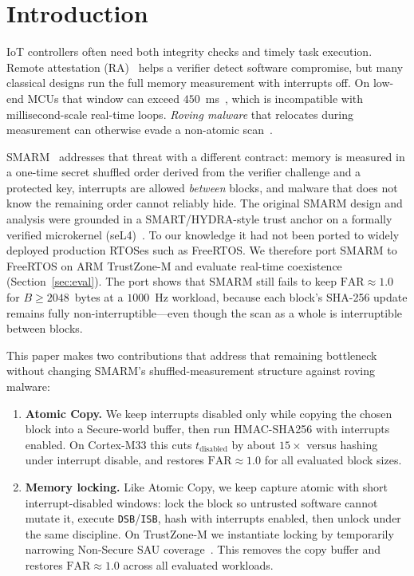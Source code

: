 \documentclass[conference]{IEEEtran}
\newcommand{\tdis}{$t_{\mathrm{disabled}}$\xspace}
\begin{document}
\section{Introduction}
\label{sec:intro}

IoT controllers often need both integrity checks and timely task
execution. Remote attestation
(RA)~\cite{eldefrawy2012smart,nunes2019vrased,eldefrawy2017hydra}
helps a verifier detect software compromise, but many classical designs
run the full memory measurement with interrupts off. On low-end MCUs
that window can exceed $450$~ms~\cite{nunes2019vrased}, which is
incompatible with millisecond-scale real-time loops.
\emph{Roving malware} that relocates during measurement can otherwise
evade a non-atomic scan~\cite{carpent2018smarm}.

SMARM~\cite{carpent2018smarm} addresses that threat with a different
contract: memory is measured in a one-time secret shuffled order derived
from the verifier challenge and a protected key, interrupts are allowed
\emph{between} blocks, and malware that does not know the remaining
order cannot reliably hide. The original SMARM design and analysis were
grounded in a SMART/HYDRA-style trust anchor on a formally verified
microkernel (seL4)~\cite{eldefrawy2017hydra,carpent2018smarm}. To our
knowledge it had not been ported to widely deployed production RTOSes
such as FreeRTOS. We therefore port SMARM to FreeRTOS on ARM
TrustZone-M and evaluate real-time coexistence (Section~\ref{sec:eval}).
The port shows that SMARM still fails to keep $\mathrm{FAR}\approx 1.0$
for $B\geq 2048$~bytes at a $1000$~Hz workload, because each block's
SHA-256 update remains fully non-interruptible---even though the scan as
a whole is interruptible between blocks.

This paper makes two contributions that address that remaining
bottleneck without changing SMARM's shuffled-measurement structure
against roving malware:

\begin{enumerate}
  \item \textbf{Atomic Copy.} We keep interrupts disabled only while
    copying the chosen block into a Secure-world buffer, then run
    HMAC-SHA256 with interrupts enabled. On Cortex-M33 this cuts
    \tdis by about $15\times$ versus hashing under interrupt disable,
    and restores $\mathrm{FAR}\approx 1.0$ for all evaluated block sizes.
  \item \textbf{Memory locking.} Like Atomic Copy, we keep capture
    atomic with short interrupt-disabled windows: lock the block so
    untrusted software cannot mutate it, execute \texttt{DSB}/\texttt{ISB},
    hash with interrupts enabled, then unlock under the same discipline.
    On TrustZone-M we instantiate locking by temporarily narrowing
    Non-Secure SAU coverage~\cite{armv8m-arm,an5347}. This removes the
    copy buffer and restores $\mathrm{FAR}\approx 1.0$ across all evaluated
    workloads.
\end{enumerate}
\end{document}
